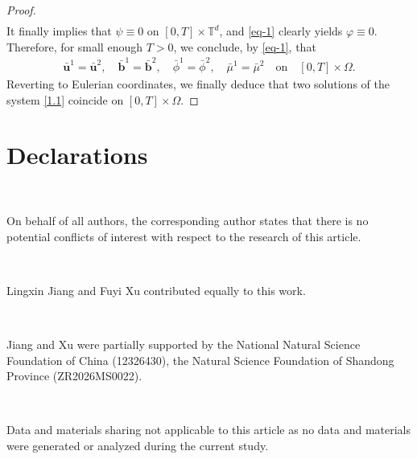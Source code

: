\documentclass[11pt]{article}
\numberwithin{equation}{section}
\begin{document}
\begin{proof}
\begin{align*}
\end{align*}
It finally implies that \( \psi \equiv 0 \) on \( [0,T] \times \mathbb{T}^d \), and \eqref{eq-1} clearly yields \( \varphi \equiv 0 \). Therefore, for small enough \( T > 0 \),  we  conclude,  by \eqref{eq-1}, that
\begin{align*}
\bar{\mathbf{u}}^1 = \bar{\mathbf{u}}^2, \quad\bar{\mathbf{b}}^1 = \bar{\mathbf{b}}^2, \quad \bar{\phi}^1 = \bar{\phi}^2, \quad \bar{\mu}^1 = \bar{\mu}^2 \quad \text{on} \quad [0,T] \times \Omega.
\end{align*}
Reverting to Eulerian coordinates, we finally deduce that  two solutions of the system \eqref{1.1} coincide on \( [0,T] \times \Omega\).
\end{proof}
\section{Declarations}




\

On behalf of all authors, the corresponding author states that there is no potential conflicts of interest with respect to the research of this article.

\

Lingxin Jiang and Fuyi  Xu contributed equally to this work.


\

Jiang and Xu were partially supported by the
National Natural Science Foundation of China (12326430), the  Natural Science Foundation of Shandong Province (ZR2026MS0022).

\

Data and materials  sharing not applicable to this article as no data and  materials
 were generated or analyzed during the current study.
\end{document}
